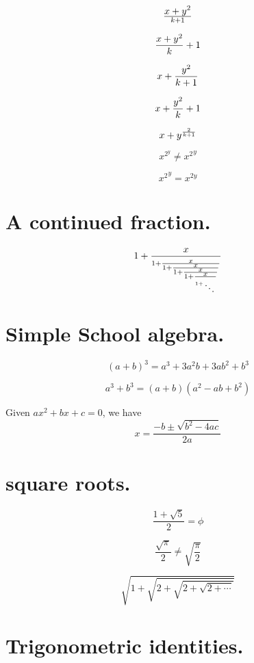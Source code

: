 $$x+y^2\over k+1$$

$${x+y^2\over k}+1$$

$$x+{y^2\over k+1}$$

$$x+{y^2\over k}+1$$

$$x+y^{2\over k+1}$$

$$x^{2^y} \neq {x^2}^y$$

$${x^2}^y = x^{2y}$$



\section{A continued fraction. }

\[ 
1+  {x \over
 {\scriptstyle 1+ {\scriptstyle x \over
 {\scriptstyle 1 + {\scriptstyle x \over
 {\scriptstyle 1 + {\scriptstyle x \over
 {\scriptstyle 1+ {\scriptstyle x \over
1+{\scriptstyle
  \atop \ddots }}}}}}}}}}
\]



\section{Simple  School  algebra.   }

$$(a+b)^3=a^3+3a^2b+3ab^2+b^3$$

$$a^3+b^3=(a+b)(a^2-ab+b^2)$$

Given $ax^2+bx+c=0$, we have
$$x= \frac{-b \pm \sqrt{b^2-4ac}}{2a}$$



\section{square roots.  }

$$\frac{1+\sqrt{5}}{2}=\phi$$

$$\frac{\sqrt{\pi}}{2} \neq \sqrt{\frac{\pi}{2}}$$

$$\sqrt{1+\sqrt{2+\sqrt{2+\sqrt {2+\cdots }}}}$$



\section{Trigonometric identities. }

